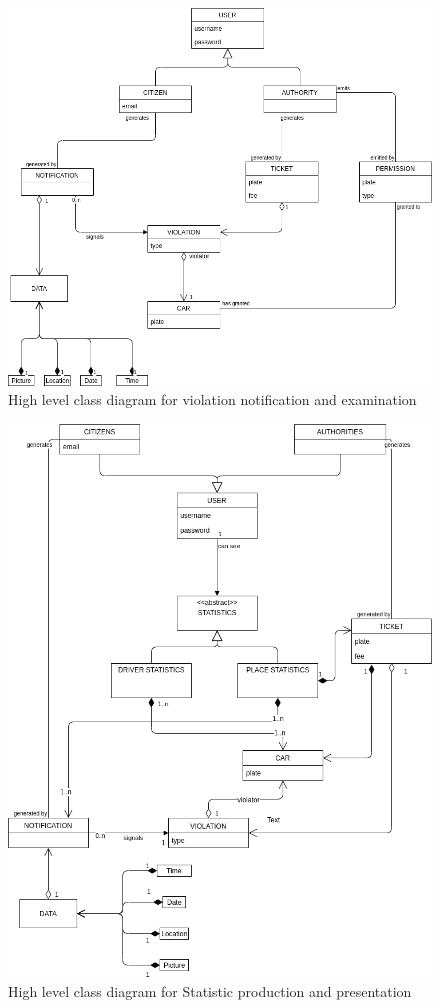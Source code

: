 \documentclass{article}
\begin{document}
		\begin{figure}[H]
			\centering
			\includegraphics[width=\linewidth]{Images/Notify_Violation_Class_Diagram.png}
		\caption{High level class diagram for violation notification and examination}
		\end{figure}
				
		\begin{figure}[H]
			\centering
			\includegraphics[width=\linewidth]{Images/Statistics_class_diagram.png}
		\caption{High level class diagram for Statistic production and presentation}
		\end{figure}
			
\end{document}
